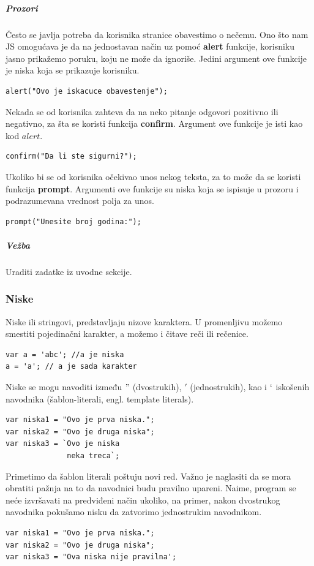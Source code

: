 \documentclass[a4paper]{article}
\begin{document}
\subparagraph{Prozori}
Često se javlja potreba da korisnika stranice obavestimo o nečemu. Ono što nam JS omogućava je da na jednostavan način uz pomoć \textbf{alert} funkcije, korisniku jasno prikažemo poruku, koju ne može da ignoriše. Jedini argument ove funkcije je niska koja se prikazuje korisniku. 
\begin{lstlisting}[backgroundcolor = \color{lightgray}]
alert("Ovo je iskacuce obavestenje");
\end{lstlisting}
Nekada se od korisnika zahteva da na neko pitanje odgovori pozitivno ili negativno, za šta se koristi funkcija \textbf{confirm}. Argument ove funkcije je isti kao kod $alert$. 
\begin{lstlisting}[backgroundcolor = \color{lightgray}]
confirm("Da li ste sigurni?");
\end{lstlisting}
Ukoliko bi se od korisnika očekivao unos nekog teksta, za to može da se koristi funkcija \textbf{prompt}. Argumenti ove funkcije su niska koja se ispisuje u prozoru i podrazumevana vrednost polja za unos. 
\begin{lstlisting}[backgroundcolor = \color{lightgray}]
prompt("Unesite broj godina:");
\end{lstlisting}
\subparagraph{Vežba}
Uraditi zadatke iz uvodne sekcije.

\subsubsection{Niske}
Niske ili stringovi, predstavljaju nizove karaktera. U promenljivu možemo smestiti pojedinačni karakter, a možemo i čitave reči ili rečenice. \\
\begin{lstlisting}[backgroundcolor = \color{lightgray}]
var a = 'abc'; //a je niska
a = 'a'; // a je sada karakter
\end{lstlisting}
Niske se mogu navoditi između $"$ (dvostrukih), $'$ (jednostrukih), kao i $`$ iskošenih navodnika (šablon-literali, engl. template literals).  
\begin{lstlisting}[backgroundcolor = \color{lightgray}]
var niska1 = "Ovo je prva niska.";
var niska2 = "Ovo je druga niska";
var niska3 = `Ovo je niska
              neka treca`;
\end{lstlisting}
Primetimo da šablon literali poštuju novi red. Važno je naglasiti da se mora obratiti pažnja na to da navodnici budu pravilno upareni. Naime, program se neće izvršavati na predviđeni način ukoliko, na primer, nakon dvostrukog navodnika pokušamo nisku da zatvorimo jednostrukim navodnikom.
\begin{lstlisting}[backgroundcolor = \color{lightgray}]
var niska1 = "Ovo je prva niska.";
var niska2 = "Ovo je druga niska";
var niska3 = "Ova niska nije pravilna';
\end{lstlisting}
\end{document}
